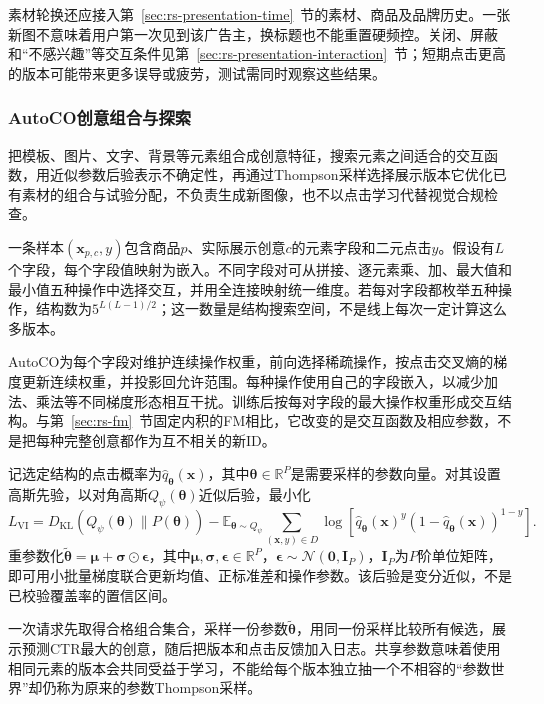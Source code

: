 素材轮换还应接入第~\ref{sec:rs-presentation-time}~节的素材、商品及品牌历史。一张新图不意味着用户第一次见到该广告主，换标题也不能重置硬频控。关闭、屏蔽和“不感兴趣”等交互条件见第~\ref{sec:rs-presentation-interaction}~节；短期点击更高的版本可能带来更多误导或疲劳，测试需同时观察这些结果。

\subsubsection{AutoCO创意组合与探索}
\label{sec:rs-advertising-autoco}

把模板、图片、文字、背景等元素组合成创意特征，搜索元素之间适合的交互函数，用近似参数后验表示不确定性，再通过Thompson采样选择展示版本它优化已有素材的组合与试验分配，不负责生成新图像，也不以点击学习代替视觉合规检查。

一条样本$(\bm{x}_{p,c},y)$包含商品$p$、实际展示创意$c$的元素字段和二元点击$y$。假设有$L$个字段，每个字段值映射为嵌入。不同字段对可从拼接、逐元素乘、加、最大值和最小值五种操作中选择交互，并用全连接映射统一维度。若每对字段都枚举五种操作，结构数为$5^{L(L-1)/2}$；这一数量是结构搜索空间，不是线上每次一定计算这么多版本。

AutoCO为每个字段对维护连续操作权重，前向选择稀疏操作，按点击交叉熵的梯度更新连续权重，并投影回允许范围。每种操作使用自己的字段嵌入，以减少加法、乘法等不同梯度形态相互干扰。训练后按每对字段的最大操作权重形成交互结构。与第~\ref{sec:rs-fm}~节固定内积的FM相比，它改变的是交互函数及相应参数，不是把每种完整创意都作为互不相关的新ID。

记选定结构的点击概率为$\widehat q_{\bm{\theta}}(\bm{x})$，其中$\bm{\theta}\in\mathbb R^P$是需要采样的参数向量。对其设置高斯先验，以对角高斯$Q_\psi(\bm{\theta})$近似后验，最小化
\begin{equation}
  L_{\mathrm{VI}}
    =D_{\mathrm{KL}}(Q_\psi(\bm{\theta})\|P(\bm{\theta}))
      -\mathbb{E}_{\bm{\theta}\sim Q_\psi}
        \sum_{(\bm{x},y)\in D}
         \log\!\left[
           \widehat q_{\bm{\theta}}(\bm{x})^y
           (1-\widehat q_{\bm{\theta}}(\bm{x}))^{1-y}
         \right].
  \label{eq:rs-advertising-autoco}
\end{equation}
重参数化$\widetilde{\bm{\theta}}=\bm{\mu}+\bm{\sigma}\odot\bm{\epsilon}$，其中$\bm{\mu},\bm{\sigma},\bm{\epsilon}\in\mathbb R^P$，$\bm{\epsilon}\sim\mathcal N(\bm{0},\bm{I}_P)$，$\bm{I}_P$为$P$阶单位矩阵，即可用小批量梯度联合更新均值、正标准差和操作参数。该后验是变分近似，不是已校验覆盖率的置信区间。

一次请求先取得合格组合集合，采样一份参数$\widetilde{\bm{\theta}}$，用同一份采样比较所有候选，展示预测CTR最大的创意，随后把版本和点击反馈加入日志。共享参数意味着使用相同元素的版本会共同受益于学习，不能给每个版本独立抽一个不相容的“参数世界”却仍称为原来的参数Thompson采样。

